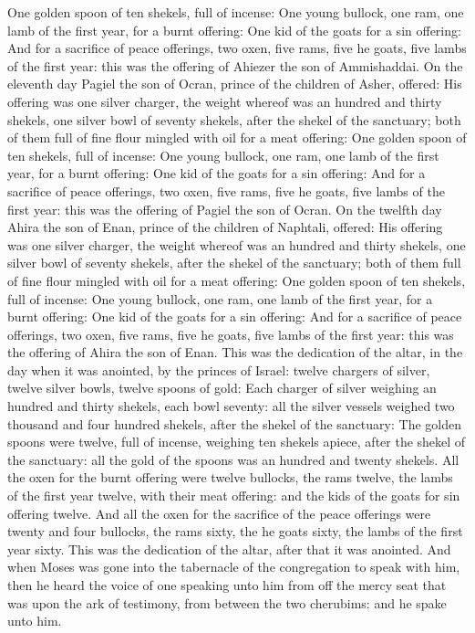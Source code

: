 \begin{biblechapter}
\verse One golden spoon of ten shekels, full of incense:
\verse One young bullock, one ram, one lamb of the first year, for a burnt offering:
\verse One kid of the goats for a sin offering:
\verse And for a sacrifice of peace offerings, two oxen, five rams, five he goats, five lambs of the first year: this was the offering of Ahiezer the son of Ammishaddai.
\verse On the eleventh day Pagiel the son of Ocran, prince of the children of Asher, offered:
\verse His offering was one silver charger, the weight whereof was an hundred and thirty shekels, one silver bowl of seventy shekels, after the shekel of the sanctuary; both of them full of fine flour mingled with oil for a meat offering:
\verse One golden spoon of ten shekels, full of incense:
\verse One young bullock, one ram, one lamb of the first year, for a burnt offering:
\verse One kid of the goats for a sin offering:
\verse And for a sacrifice of peace offerings, two oxen, five rams, five he goats, five lambs of the first year: this was the offering of Pagiel the son of Ocran.
\verse On the twelfth day Ahira the son of Enan, prince of the children of Naphtali, offered:
\verse His offering was one silver charger, the weight whereof was an hundred and thirty shekels, one silver bowl of seventy shekels, after the shekel of the sanctuary; both of them full of fine flour mingled with oil for a meat offering:
\verse One golden spoon of ten shekels, full of incense:
\verse One young bullock, one ram, one lamb of the first year, for a burnt offering:
\verse One kid of the goats for a sin offering:
\verse And for a sacrifice of peace offerings, two oxen, five rams, five he goats, five lambs of the first year: this was the offering of Ahira the son of Enan.
\verse This was the dedication of the altar, in the day when it was anointed, by the princes of Israel: twelve chargers of silver, twelve silver bowls, twelve spoons of gold:
\verse Each charger of silver weighing an hundred and thirty shekels, each bowl seventy: all the silver vessels weighed two thousand and four hundred shekels, after the shekel of the sanctuary:
\verse The golden spoons were twelve, full of incense, weighing ten shekels apiece, after the shekel of the sanctuary: all the gold of the spoons was an hundred and twenty shekels.
\verse All the oxen for the burnt offering were twelve bullocks, the rams twelve, the lambs of the first year twelve, with their meat offering: and the kids of the goats for sin offering twelve.
\verse And all the oxen for the sacrifice of the peace offerings were twenty and four bullocks, the rams sixty, the he goats sixty, the lambs of the first year sixty. This was the dedication of the altar, after that it was anointed.
\verse And when Moses was gone into the tabernacle of the congregation to speak with him, then he heard the voice of one speaking unto him from off the mercy seat that was upon the ark of testimony, from between the two cherubims: and he spake unto him.
\end{biblechapter}

